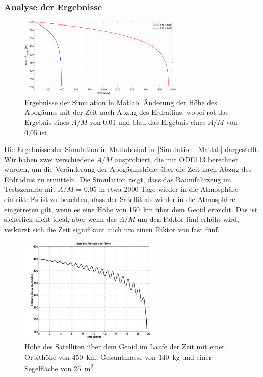 \documentclass{article}
\begin{document}
\subsubsection{Analyse der Ergebnisse}
\begin{figure}[H]
	\centering
	\includegraphics[width=0.7\textwidth]{bilder/Simulation_Matlab.png}
	\caption{Ergebnisse der Simulation in Matlab: Änderung der Höhe des Apogäums mit der Zeit nach Abzug des Erdradius, wobei rot das Ergebnis eines $A/M$ von 0,01 und blau das Ergebnis eines $A/M$ von 0,05 ist.}
	\label{Simulation_Matlab}
\end{figure}
Die Ergebnisse der Simulation in Matlab sind in \autoref{Simulation_Matlab} dargestellt. Wir haben zwei verschiedene $A/M$ ausprobiert, die mit ODE113 berechnet wurden, um die Veränderung der Apogäumshöhe über die Zeit nach Abzug des Erdradius zu ermitteln. Die Simulation zeigt, dass das Raumfahrzeug im Testszenario mit $A/M$ = 0,05 in etwa 2000 Tage wieder in die Atmosphäre eintritt: Es ist zu beachten, dass der Satellit als wieder in die Atmosphäre eingetreten gilt, wenn es eine Höhe von \SI{150}{\kilo\meter} über dem Geoid erreicht. Das ist sicherlich nicht ideal, aber wenn das $A/M$ um den Faktor fünf erhöht wird, verkürzt sich die Zeit signifikant auch um einen Faktor von fast fünf.
\begin{figure}[H]
	\centering
	\includegraphics[width=0.6\textwidth]{bilder/Simulation_paper.png}
	\caption{Höhe des Satelliten über dem Geoid im Laufe der Zeit mit einer Orbithöhe von \SI{450}{\kilo\meter},  Gesamtmasse von \SI{140}{\kilo\gram} und einer Segelfläche von \SI{25}{\square \meter}}
	\label{Simulation_paper}
\end{figure}
\end{document}

